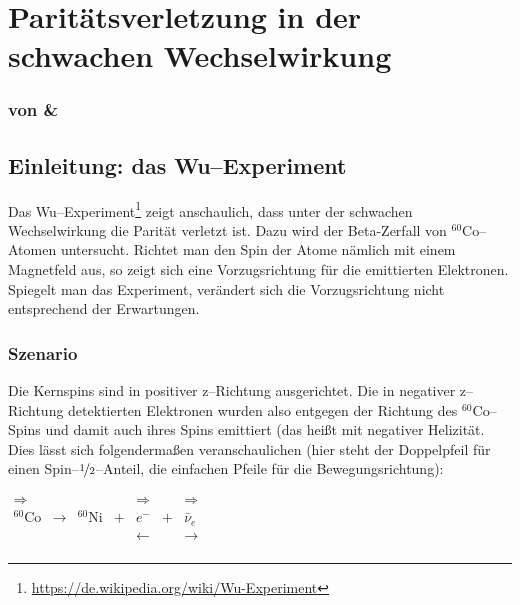 \documentclass[Ex4_Zusammenfassung.tex]{subfiles}
\begin{document}
\section{Paritätsverletzung in der schwachen Wechselwirkung}
\subsubsection*{von \mitsch \& \anton}

\subsection{Einleitung: das Wu--Experiment}

Das Wu--Experiment\footnote{\href{https://de.wikipedia.org/wiki/Wu-Experiment}{https://de.wikipedia.org/wiki/Wu-Experiment}} zeigt anschaulich, dass unter der schwachen Wechselwirkung die Parität verletzt ist. Dazu wird der Beta-Zerfall von $ ^{60}\text{Co}$--Atomen untersucht. Richtet man den Spin der Atome nämlich mit einem Magnetfeld aus, so zeigt sich eine Vorzugsrichtung für die emittierten Elektronen. Spiegelt man das Experiment, verändert sich die Vorzugsrichtung nicht entsprechend der Erwartungen.
\subsubsection*{Szenario}
Die Kernspins sind in positiver z--Richtung ausgerichtet. Die in negativer z--Richtung detektierten Elektronen wurden also entgegen der Richtung des $^{60}\text{Co}$--Spins und damit auch ihres Spins emittiert (das 
heißt mit negativer Helizität. Dies lässt sich folgendermaßen veranschaulichen (hier steht der Doppelpfeil für einen Spin--$\nicefrac{1}{2}$--Anteil, die einfachen Pfeile für die Bewegungsrichtung):
\begin{table}[h]
	\centering
	$
	\begin{array}{ccccccc}
	\Longrightarrow  &                 &                  &   & \Rightarrow    &   &\Rightarrow     \\
	{}^{60}\text{Co}        & \longrightarrow & {}^{60}\text{Ni} & + & e^-  & + & \bar{\nu}_e     \\
	&                 &                  &   & \longleftarrow &   & \longrightarrow \\
	\end{array}
	$
\end{table}
\end{document}
